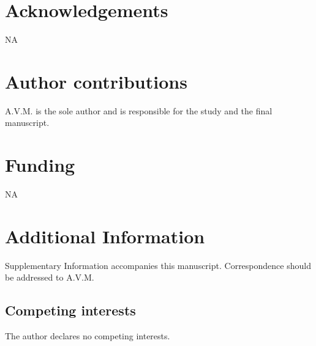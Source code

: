 \documentclass[fleqn,10pt]{wlscirep}
\begin{document}


\section*{Acknowledgements}

NA

\section*{Author contributions}

A.V.M. is the sole author and is responsible for the study and the final manuscript.

\section*{Funding}

NA

\section*{Additional Information}
Supplementary Information accompanies this manuscript. Correspondence should be addressed to A.V.M.
\subsection*{Competing interests}

The author declares no competing interests.
\end{document}
